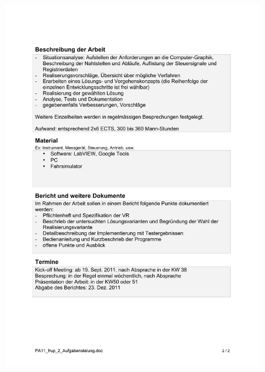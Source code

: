 \begin{figure}[H]
	\flushleft
	\includegraphics[width=\linewidth]{src/aufgabenstellung_seite2.pdf}
\end{figure}


